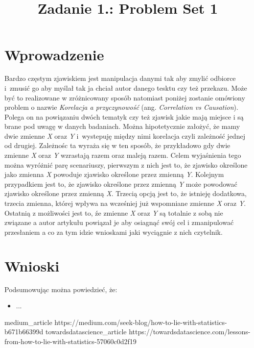 \documentclass{classrep}
\author{%
    \studentinfo[239676@edu.p.lodz.pl]{Kamil Kowalewski}{239676}
}
\title{Zadanie 1.: Problem Set 1}
\begin{document}
    \maketitle
    \thispagestyle{fancyplain}

    \section{Wprowadzenie} {
        Bardzo częstym zjawiskiem jest manipulacja danymi tak aby zmylić odbiorce
        i~zmusić go aby myślał tak ja chciał autor danego tesktu czy też przekazu.
        Może być to realizowane w zróżnicowany sposób natomiast poniżej zostanie
        omówiony problem o nazwie \emph{Korelacja a przyczynowość}
        (ang. \emph{Correlation vs Causation}). Polega on na powiązaniu dwóch tematyk
        czy też zjawisk jakie mają miejsce i są brane pod uwagę w danych badaniach.
        Można hipotetycznie założyć, że mamy dwie zmienne \textit{X} oraz \textit{Y}
        i~wystepuję między nimi korelacja czyli zależność jednej od drugiej. Zależnośc
        ta wyraża się w ten sposób, że przykładowo gdy dwie zmienne \textit{X}
        oraz \textit{Y} wzrastają razem oraz maleją razem. Celem wyjaśnienia tego można
        wyróżnić parę scenariuszy, pierwszym z nich jest to, że zjawisko określone jako
        zmienna \textit{X} powoduje zjawisko określone przez zmienną \textit{Y}.
        Kolejnym przypadkiem jest to, że zjawisko określone przez zmienną \textit{Y}
        może powodować zjawisko określone przez zmienną \textit{X}. Trzecią opcją jest
        to, że istnieję dodatkowa, trzecia zmienna, której wpływa na wcześniej już
        wspomniane zmienne \textit{X} oraz \textit{Y}. Ostatnią z możliwości jest to,
        źe zmienne \textit{X} oraz \textit{Y} są totalnie z sobą nie związane a autor
        artykułu powiązał je aby osiagnąć swój cel i zmanipulować przesłaniem a co za
        tym idzie wnioskami jaki wyciągnie z nich czytelnik.

    }

    \section{} {

    }

    \section{Wnioski} {
        Podsumowując można powiedzieć, że:
        \begin{itemize}
            \item ...

        \end{itemize}
    }

    \begin{thebibliography}{0}
        \bibitem
        {medium_article}
        {https://medium.com/seek-blog/how-to-lie-with-statistics-b671b66399d}
        \bibitem
        {towardsdatascience_article}
        {https://towardsdatascience.com/lessons-from-how-to-lie-with-statistics-57060c0d2f19}
    \end{thebibliography}
\end{document}
